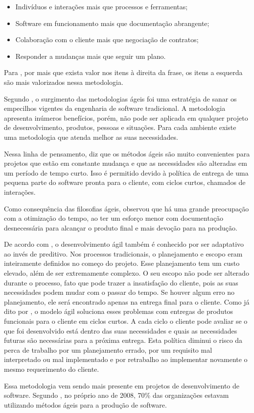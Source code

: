 \begin{itemize}
    \item Indivíduos e interações mais que processos e ferramentas;
    \item Software em funcionamento mais que documentação abrangente;
    \item Colaboração com o cliente mais que negociação de contratos;
    \item Responder a mudanças mais que seguir um plano.
\end{itemize}

Para \cite{beck2001agile}, por mais que exista valor nos itens à direita da frase, os itens a esquerda são mais valorizados nessa metodologia.

Segundo \cite{pressman2009engenharia}, o surgimento das metodologias ágeis foi uma estratégia de sanar os empecilhos vigentes da engenharia de software tradicional. A metodologia apresenta inúmeros benefícios, porém, não pode ser aplicada em qualquer projeto de desenvolvimento, produtos, pessoas e situações. Para cada ambiente existe uma metodologia que atenda melhor as suas necessidades.

Nessa linha de pensamento, \cite{pressman2009engenharia} diz que os métodos ágeis são muito convenientes para projetos que estão em constante mudança e que as necessidades são alteradas em um período de tempo curto. Isso é permitido devido à política de entrega de uma pequena parte do software pronta para o cliente, com ciclos curtos, chamados de interações.

Como consequência das filosofias ágeis, \cite{soares} observou que há uma grande preocupação com a otimização do tempo, ao ter um esforço menor com documentação desnecessária para alcançar o produto final e mais devoção para na produção.

De acordo com \cite{soares}, o desenvolvimento ágil também é conhecido por ser adaptativo ao invés de preditivo. Nos processos tradicionais, o planejamento e escopo eram inteiramente definidos no começo do projeto. Esse planejamento tem um custo elevado, além de ser extremamente complexo. O seu escopo não pode ser alterado durante o processo, fato que pode trazer a insatisfação do cliente, pois as suas necessidades podem mudar com o passar do tempo. Se houver algum erro no planejamento, ele será encontrado apenas na entrega final para o cliente. Como já dito por \cite{pressman2009engenharia}, o modelo ágil soluciona esses problemas com entregas de produtos funcionais para o cliente em ciclos curtos. A cada ciclo o cliente pode avaliar se o que foi desenvolvido está dentro das suas necessidades e quais as necessidades futuras são necessárias para a próxima entrega. Esta política diminui o risco da perca de trabalho por um planejamento errado, por um requisito mal interpretado ou mal implementado e por retrabalho ao implementar novamente o mesmo requerimento do cliente.

Essa metodologia vem sendo mais presente em projetos de desenvolvimento de software. Segundo \cite{thegood}, no próprio ano de 2008, 70\% das organizações estavam utilizando métodos ágeis para a produção de software.
